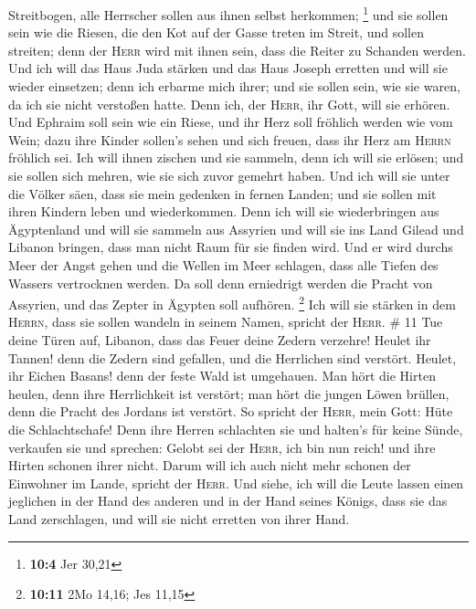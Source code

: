 Streitbogen, alle Herrscher sollen aus ihnen selbst herkommen;
\footnote{\textbf{10:4} Jer 30,21}  und sie sollen sein
wie die Riesen, die den Kot auf der Gasse treten im Streit, und sollen
streiten; denn der \textsc{Herr} wird mit ihnen sein, dass die Reiter zu
Schanden werden.  Und ich will das Haus Juda stärken und
das Haus Joseph erretten und will sie wieder einsetzen; denn ich erbarme
mich ihrer; und sie sollen sein, wie sie waren, da ich sie nicht
verstoßen hatte. Denn ich, der \textsc{Herr}, ihr Gott, will sie
erhören.  Und Ephraim soll sein wie ein Riese, und ihr
Herz soll fröhlich werden wie vom Wein; dazu ihre Kinder sollen's sehen
und sich freuen, dass ihr Herz am \textsc{Herrn} fröhlich sei.
 Ich will ihnen zischen und sie sammeln, denn ich will sie
erlösen; und sie sollen sich mehren, wie sie sich zuvor gemehrt haben.
 Und ich will sie unter die Völker säen, dass sie mein
gedenken in fernen Landen; und sie sollen mit ihren Kindern leben und
wiederkommen.  Denn ich will sie wiederbringen aus
Ägyptenland und will sie sammeln aus Assyrien und will sie ins Land
Gilead und Libanon bringen, dass man nicht Raum für sie finden wird.
 Und er wird durchs Meer der Angst gehen und die Wellen
im Meer schlagen, dass alle Tiefen des Wassers vertrocknen werden. Da
soll denn erniedrigt werden die Pracht von Assyrien, und das Zepter in
Ägypten soll aufhören. \footnote{\textbf{10:11} 2Mo 14,16; Jes 11,15}
 Ich will sie stärken in dem \textsc{Herrn}, dass sie
sollen wandeln in seinem Namen, spricht der \textsc{Herr}. \# 11
 Tue deine Türen auf, Libanon, dass das Feuer deine Zedern
verzehre!  Heulet ihr Tannen! denn die Zedern sind
gefallen, und die Herrlichen sind verstört. Heulet, ihr Eichen Basans!
denn der feste Wald ist umgehauen.  Man hört die Hirten
heulen, denn ihre Herrlichkeit ist verstört; man hört die jungen Löwen
brüllen, denn die Pracht des Jordans ist verstört.  So
spricht der \textsc{Herr}, mein Gott: Hüte die Schlachtschafe!
 Denn ihre Herren schlachten sie und halten's für keine
Sünde, verkaufen sie und sprechen: Gelobt sei der \textsc{Herr}, ich bin
nun reich! und ihre Hirten schonen ihrer nicht.  Darum
will ich auch nicht mehr schonen der Einwohner im Lande, spricht der
\textsc{Herr}. Und siehe, ich will die Leute lassen einen jeglichen in
der Hand des anderen und in der Hand seines Königs, dass sie das Land
zerschlagen, und will sie nicht erretten von ihrer Hand. 
